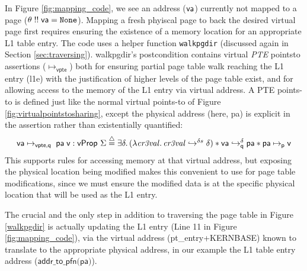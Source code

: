 In Figure \ref{fig:mapping_code}, we see an address ($\vaddr$) currently not
mapped to a page ($\theta \; !!\; \vaddr = \texttt{None}$). Mapping a fresh
phyiscal page to back the desired virtual page first requires ensuring
the existence of a memory location for an appropriate L1 table entry.
The code uses a helper function \lstinline{walkpgdir} (discussed again in Section \ref{sec:traversing}).
\textsf{walkpgdir}'s postcondition contains virtual \emph{PTE} pointsto assertions ($\mapsto_{\textsf{vpte}}$)
both for ensuring partial page table walk reaching the
L1 entry (l1e) with the justification of higher levels of the page table exist, and for allowing access to the memory of the L1 entry via virtual address.
A PTE points-to is defined just like the normal virtual points-to of Figure \ref{fig:virtualpointstosharing}, except the physical address (here, \textsf{pa}) is explicit in the assertion 
rather than existentially quantified:
 \[
\begin{array}{l}
    \vaddr\mapsto_{\textsf{vpte,q}} \; \paddr \; \vpage : \mathsf{vProp}~\Sigma \stackrel{\triangle}{=} 
    \exists \delta\ldotp
	(\lambda \mathit{cr3val}\ldotp
	\ghostmaptoken{\delta{}s}{\mathit{cr3val}}{\delta}) \ast 
  \fracghostmaptoken{\delta}{\vaddr}{\paddr}{\qfrac} \ast \paddr \mapsto_{\mathsf{p}} \vpage
\end{array}
\]
This supports rules for accessing memory
at that virtual address, but exposing the physical location being modified
makes this convenient to use for page table modifications, since we must ensure
the modified data is at the specific physical location that will be used as the L1 entry.


The crucial and the only step in addition to traversing the page table in Figure \ref{walkpgdir} is actually updating the L1 entry (Line 11 in Figure \ref{fig:mapping_code}),
via the virtual address
(\textsf{pt\_entry+KERNBASE}) known to translate to the appropriate physical address, in our example the L1
table entry address ($\textsf{addr\_to\_pfn(pa)}$).

